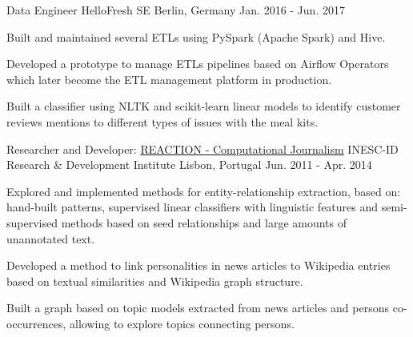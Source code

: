 \begin{cventries}
  \cventry
    {Data Engineer} %
    {HelloFresh SE} %
    {Berlin, Germany} %
    {Jan. 2016 - Jun. 2017} %
    {
      \begin{cvitems} %
        \item {Built and maintained several ETLs using PySpark (Apache Spark) and Hive.}
        \item {Developed a prototype to manage ETLs pipelines based on Airflow Operators which later become the ETL management platform in production.}
        \item {Built a classifier using NLTK and scikit-learn linear models to identify customer reviews mentions to different types of issues with the meal kits.}
      \end{cvitems}
    }
	
  \cventry
    {Researcher and Developer: \href{http://arquivo.pt/wayback/20151118124735/http://dmir.inesc-id.pt/project/Reaction}{REACTION - Computational Journalism}} %
    {INESC-ID Research \& Development Institute} %
    {Lisbon, Portugal} %
    {Jun. 2011 - Apr. 2014} %
    {
      \begin{cvitems} %
        \item {Explored and implemented methods for entity-relationship extraction, based on: hand-built patterns, supervised linear classifiers with linguistic features and semi-supervised methods based on seed relationships and large amounts of unannotated text.}
        \item {Developed a method to link personalities in news articles to Wikipedia entries based on textual similarities and Wikipedia graph structure.}
        \item {Built a graph based on topic models extracted from news articles and persons co-occurrences, allowing to explore topics connecting persons.}
      \end{cvitems}
    }



\end{cventries}
